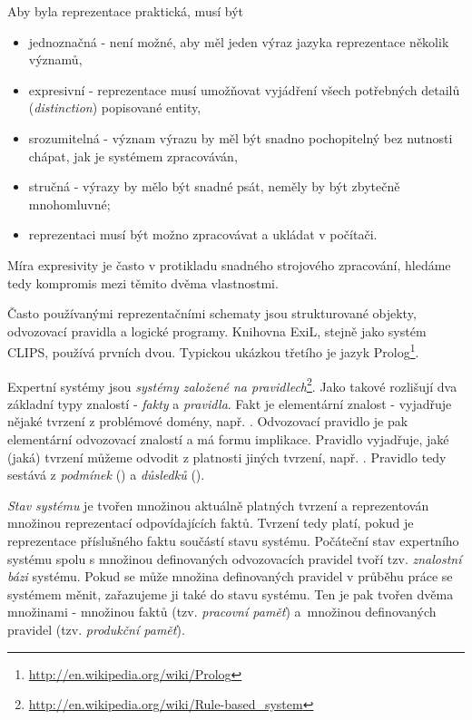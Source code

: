 Aby byla reprezentace praktická, musí být
\begin{itemize}
  \item jednoznačná - není možné, aby měl jeden výraz jazyka reprezentace
    několik významů,
  \item expresivní - reprezentace musí umožňovat vyjádření všech potřebných
    detailů (\emph{distinction}) popisované entity,
  \item srozumitelná - význam výrazu by měl být snadno pochopitelný bez
    nutnosti chápat, jak je systémem zpracováván,
  \item stručná - výrazy by mělo být snadné psát, neměly by být zbytečně
    mnohomluvné;
  \item reprezentaci musí být možno zpracovávat a ukládat v počítači.
\end{itemize}
Míra expresivity je často v protikladu snadného strojového zpracování, hledáme
tedy kompromis mezi těmito dvěma vlastnostmi.

Často používanými reprezentačními schematy jsou strukturované objekty,
odvozovací pravidla a logické programy. Knihovna ExiL, stejně jako systém CLIPS,
používá prvních dvou. Typickou ukázkou třetího je jazyk
Prolog\footnote{\url{http://en.wikipedia.org/wiki/Prolog}}.

Expertní systémy jsou \emph{systémy založené na
pravidlech}\footnote{\url{http://en.wikipedia.org/wiki/Rule-based\_system}}.
Jako takové rozlišují dva základní typy znalostí - \emph{fakty} a
\emph{pravidla}. Fakt je elementární  znalost - vyjadřuje nějaké
tvrzení z problémové domény, např. . Odvozovací pravidlo je
pak elementární odvozovací znalostí a má formu implikace. Pravidlo vyjadřuje,
jaké (jaká) tvrzení můžeme odvodit z platnosti jiných tvrzení, např. . Pravidlo tedy sestává z \emph{podmínek} () a \emph{důsledků} ().

\emph{Stav systému} je tvořen množinou aktuálně platných tvrzení a reprezentován
množinou reprezentací odpovídajících faktů. Tvrzení tedy platí, pokud je
reprezentace příslušného faktu součástí stavu systému. Počáteční stav expertního
systému spolu s množinou definovaných odvozovacích pravidel tvoří tzv.
\emph{znalostní bázi} systému. Pokud se může množina definovaných pravidel v
průběhu práce se systémem měnit, zařazujeme ji také do stavu systému. Ten je pak
tvořen dvěma množinami - množinou faktů (tzv.  \emph{pracovní paměť}) a~množinou
definovaných pravidel (tzv. \emph{produkční paměť}).

